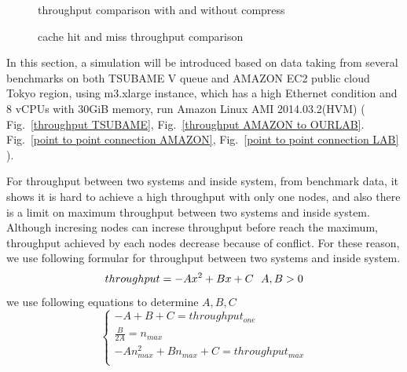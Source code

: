 \documentclass[JIP,draft]{ipsj}
\begin{document}
\begin{figure}[tb]
	\centering
	\caption{throughput comparison with and without compress}
	\label{compress}
\end{figure}

\begin{figure}[tb]
	\centering
	\caption{cache hit and miss throughput comparison}
	\label{cache hit}
\end{figure}


In this section, a simulation will be introduced based on data taking from several benchmarks on both TSUBAME V queue and AMAZON EC2 public cloud Tokyo region, using
m3.xlarge instance, which has a high Ethernet condition and 8 vCPUs with 30GiB memory, run Amazon Linux AMI 2014.03.2(HVM) ( Fig.~\ref{throughput TSUBAME}, Fig.~\ref{throughput AMAZON to OURLAB}. Fig.~\ref{point to point connection AMAZON}, Fig.~\ref{point to point connection LAB} ).

	
For throughput between two systems and inside system, from benchmark data, it shows it is hard to achieve a high throughput with only one nodes, and also there is a limit on maximum throughput between two systems and inside system.
Although incresing nodes can increse throughput before reach the maximum, throughput achieved by each nodes decrease because of conflict.
For these reason, we use following formular for throughput between two systems and inside system.
\begin{equation}
throughput=-Ax^2+Bx+C~~ A,B>0\\
\end{equation}
we use following equations to determine $A,B,C$
\begin{equation}
\begin{cases}
	-A+B+C=throughput_{one}\\\nonumber
	\frac{B}{2A}=n_{max}\\\nonumber
	-An_{max}^2+Bn_{max}+C=throughput_{max}\\
\end{cases}
\end{equation}
\end{document}
